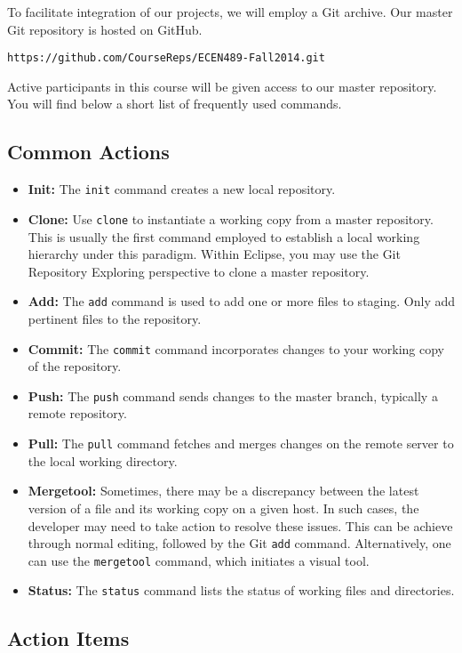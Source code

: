 \documentclass[11pt]{article}
\begin{document}
To facilitate integration of our projects, we will employ a Git archive.
Our master Git repository is hosted on GitHub.
\begin{center}
\texttt{https://github.com/CourseReps/ECEN489-Fall2014.git}
\end{center}
Active participants in this course will be given access to our master repository.
You will find below a short list of frequently used commands.


\subsection*{Common Actions}

\begin{itemize}
\item \textbf{Init:}
The \texttt{init} command creates a new local repository.
\item \textbf{Clone:}
Use \texttt{clone} to instantiate a working copy from a master repository.
This is usually the first command employed to establish a local working hierarchy under this paradigm.
Within Eclipse, you may use the Git Repository Exploring perspective to clone a master repository.
\item \textbf{Add:}
The \texttt{add} command is used to add one or more files to staging.
Only add pertinent files to the repository.
\item \textbf{Commit:}
The \texttt{commit} command incorporates changes to your working copy of the repository.
\item \textbf{Push:}
The \texttt{push} command sends changes to the master branch, typically a remote repository.
\item \textbf{Pull:}
The \texttt{pull} command fetches and merges changes on the remote server to the local working directory.
\item \textbf{Mergetool:}
Sometimes, there may be a discrepancy between the latest version of a file and its working copy on a given host.
In such cases, the developer may need to take action to resolve these issues.
This can be achieve through normal editing, followed by the Git \texttt{add} command.
Alternatively, one can use the  \texttt{mergetool} command, which initiates a visual tool.
\item \textbf{Status:}
The \texttt{status} command lists the status of working files and directories.
\end{itemize}


\subsection*{Action Items}
\end{document}
